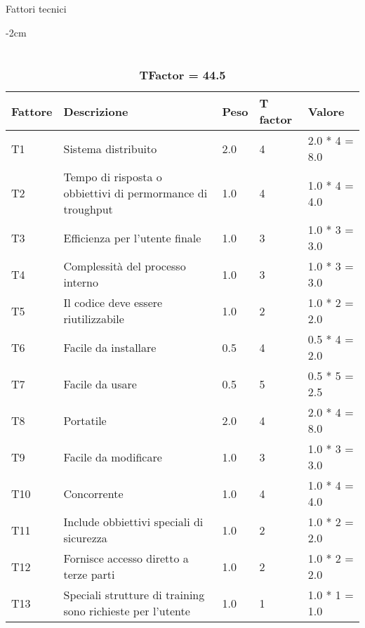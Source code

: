 \begin{table}[hb]
\caption{Fattori tecnici}
    \centering
        \addtolength{\leftskip} {-2cm}
\begin{tabular}{ |P{2.5cm}|P{5cm}|P{2.5cm}|P{2.5cm}|P{2.5cm}|  }
\hline
\textbf{Fattore} & \textbf{Descrizione} & \textbf{Peso} & \textbf{T factor} & \textbf{Valore} \\\hline
T1 & Sistema distribuito & 2.0 & 4 & 2.0 * 4 = 8.0\\\hline
T2 & Tempo di risposta o obbiettivi di permormance di troughput & 1.0& 4& 1.0 * 4 = 4.0\\\hline
T3 & Efficienza per l'utente finale & 1.0& 3& 1.0 * 3 = 3.0\\\hline
T4 & Complessità del processo interno & 1.0& 3& 1.0 * 3 = 3.0\\\hline
T5 & Il codice deve essere riutilizzabile & 1.0& 2& 1.0 * 2 = 2.0\\\hline
T6 & Facile da installare & 0.5& 4& 0.5 * 4 = 2.0\\\hline
T7 & Facile da usare & 0.5& 5& 0.5 * 5 = 2.5\\\hline
T8 & Portatile & 2.0& 4& 2.0 * 4 = 8.0\\\hline
T9 & Facile da modificare & 1.0& 3& 1.0 * 3 = 3.0\\\hline
T10 & Concorrente & 1.0& 4& 1.0 * 4 = 4.0\\\hline
T11 & Include obbiettivi speciali di sicurezza & 1.0& 2& 1.0 * 2 = 2.0\\\hline
T12 & Fornisce accesso diretto a terze parti & 1.0& 2& 1.0 * 2 = 2.0\\\hline
T13 & Speciali strutture di training sono richieste per l'utente & 1.0& 1& 1.0 * 1 = 1.0\\\hline
\end{tabular}
\caption*{\\\textbf{TFactor = 44.5}}
\end{table}

